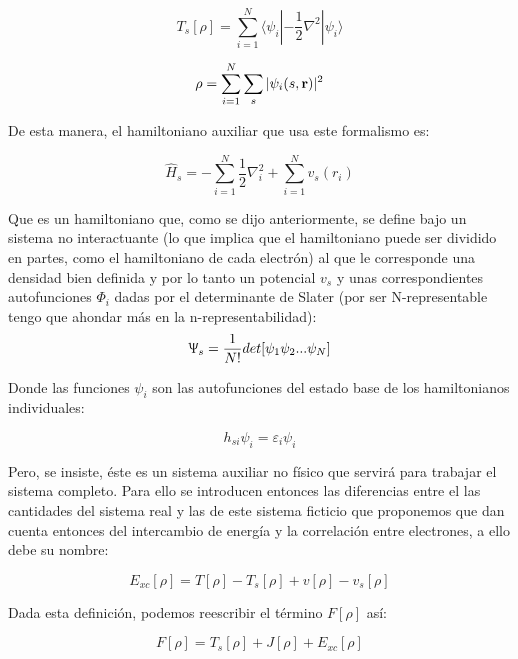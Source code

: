 \documentclass [11pt]{article}
\begin{document}
\begin{equation}
	T_s[\rho]=\sum_{i=1}^{N}\langle\psi_i|-\frac{1}{2}\nabla^2|\psi_i\rangle
\end{equation}
	
\begin{equation}
	\rho=\sum_{i=1}^{N}\sum_{s}^{}|\psi_i(s,{\bf r})|^2
\end{equation}

De esta manera, el hamiltoniano auxiliar que usa este formalismo es:

\begin{equation}
	\hat{H}_s=-\sum_{i=1}^{N}\frac{1}{2}\nabla_i^2+\sum_{i=1}^{N}v_s(r_i)
\end{equation}

Que es un hamiltoniano que, como se dijo anteriormente, se define bajo un sistema no interactuante (lo que implica que el hamiltoniano puede ser dividido en partes, como el hamiltoniano de cada electrón) al que le corresponde una densidad bien definida y por lo tanto un potencial $v_s$ y unas correspondientes autofunciones $\Phi_i$ dadas por el determinante de Slater (por ser N-representable {\color{magenta} tengo que ahondar más en la n-representabilidad}):
\begin{equation}
    \Uppsi_s=\frac{1}{N!}det[\psi_1\psi_2...\psi_N]
\end{equation}

Donde las funciones $\psi_i$ son las autofunciones del estado base de los hamiltonianos individuales:

\begin{equation}
    h_{si}\psi_i=\varepsilon_i\psi_i
\end{equation}

Pero, se insiste, éste es un sistema auxiliar no físico que servirá para trabajar el sistema completo. Para ello se introducen entonces las diferencias entre el las cantidades del sistema real y las de este sistema ficticio que proponemos que dan cuenta entonces del intercambio de energía y la correlación entre electrones, a ello debe su nombre:

\begin{equation}
     E_{xc}[\rho]=T[\rho]-T_s[\rho]+v[\rho]-v_s[\rho]
\end{equation}

Dada esta definición, podemos reescribir el término $F[\rho]$ así:

\begin{equation}
	F[\rho]=T_s[\rho]+J[\rho]+E_{xc}[\rho]
\end{equation}
\end{document}

